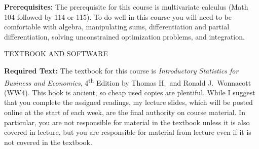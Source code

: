 \documentclass[11pt, letterpaper]{article}
\begin{document}
\noindent \textbf{Prerequisites:} The prerequisite for this course is multivariate calculus (Math 104 followed by
114 or 115). To do well in this course you will need to be comfortable with algebra, manipulating
sums, differentiation and partial differentiation, solving unconstrained optimization problems, and
integration. 


\vspace{0.2in}

\begin{center}
\small
TEXTBOOK AND SOFTWARE
\end{center}

\noindent \textbf{Required Text:} 
The textbook for this course is \emph{Introductory Statistics for Business and Economics}, 4\textsuperscript{th} Edition by Thomas H.\ and Ronald J.\ Wonnacott (WW4). This book is ancient, so cheap used copies are plentiful. While I suggest that you complete
the assigned readings, my lecture slides, which will be posted online at the start of each week, are
the final authority on course material. In particular, you are not responsible for material in the
textbook unless it is also covered in lecture, but you are responsible for material from lecture even
if it is not covered in the textbook.

\medskip


%
\end{document}
